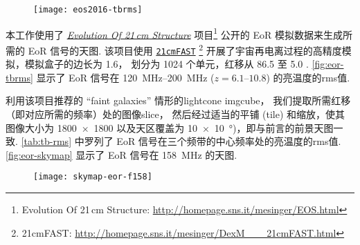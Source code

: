 \begin{figure}[htp]
  \centering
  \texttt{[image: eos2016-tbrms]}
  \label{fig:eor-tbrms}
\end{figure}

本工作使用了
\href{http://homepage.sns.it/mesinger/EOS.html}{\textit{Evolution Of 21\,cm Structure}}
项目\footnote{%
  Evolution Of 21\,cm Structure:
  \url{http://homepage.sns.it/mesinger/EOS.html}
} 公开的 EoR 模拟数据来生成所需的 EoR 信号的天图.
该项目使用
\href{http://homepage.sns.it/mesinger/DexM___21cmFAST.html}{\texttt{21cmFAST}}%
\footnote{%
  21cmFAST: \url{http://homepage.sns.it/mesinger/DexM___21cmFAST.html}
} 开展了宇宙再电离过程的高精度模拟，模拟盒子的边长为 \SI{1.6}{\Gpc}，
划分为 1024 个单元，红移从 86.5 至 5.0 \cite{mesinger2016}.
\autoref{fig:eor-tbrms} 显示了 EoR 信号在 \SIrange{120}{200}{\MHz}
($z = \numrange{6.1}{10.8}$) 的亮温度的\acs*{rms}值.

利用该项目推荐的 \enquote{faint galaxies} 情形的\ac{lightcone} \ac{imgcube}，
我们提取所需红移（即对应所需的频率）处的图像\ac{slice}，
然后经过适当的平铺 (tile) 和缩放，使其图像大小为 \num{1800 x 1800}
以及天区覆盖为 \SI{10 x 10}{\degree})，即与前言的前景天图一致.
\autoref{tab:tb-rms} 中罗列了 EoR 信号在三个频带的中心频率处的亮温度的\ac{rms}值.
\autoref{fig:eor-skymap} 显示了 EoR 信号在 \SI{158}{\MHz} 的天图.

\begin{figure}[htp]
  \centering
  \texttt{[image: skymap-eor-f158]}
  \label{fig:eor-skymap}
\end{figure}


